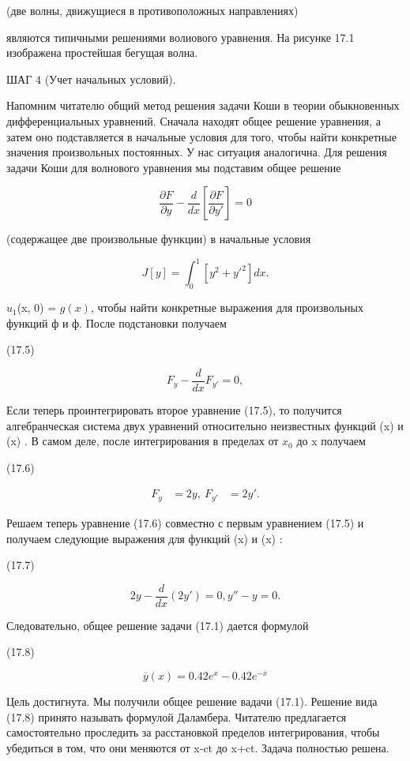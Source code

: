 \documentclass[
  ukrainian,
]{article}
\begin{document}
(две волны, движущиеся в противоположных направлениях)

являются типичными решениями волиового уравнения. На рисунке 17.1
изображена простейшая бегущая волна.

ШАГ 4 (Учет начальных условий).

Напомним читателю общий метод решения задачи Коши в теории обыкновенных
дифференциальных уравнений. Сначала находят общее решение уравнения, а
затем оно подставляется в начальные условия для того, чтобы найти
конкретные значения произвольных постоянных. У нас ситуация аналогична.
Для решения задачи Коши для волнового уравнения мы подставим общее
решение

\[
\frac{\partial F}{\partial y} - \frac{d}{dx} \left[ \frac{\partial F}{\partial y'} \right] = 0
\]

(содержащее две произвольные функции) в начальные условия

\[
J[y] = \int_{0}^{1} [y^{2} + y'^{2}] dx.
\]

\(u_1\)(x, 0) = \(g(x)\), чтобы найти конкретные выражения для
произвольных функций ф и ф. После подстановки получаем

(17.5)

\[
F_y - \frac{d}{dx} F_{y'} = 0,
\]

Если теперь проинтегрировать второе уравнение (17.5), то получится
алгебранческая система двух уравнений относительно неизвестных функций
\varphi(x) и \psi(x) . В самом деле, после интегрирования в пределах от
\(x_0\) до x получаем

(17.6)

\[
\begin{aligned} F_y &= 2y, \ F_{y'} &= 2y'. \end{aligned}
\]

Решаем теперь уравнение (17.6) совместно с первым уравнением (17.5) и
получаем следующие выражения для функций \varphi(x) и \psi(x) :

(17.7)

\[
2y - \frac{d}{dx}(2y') = 0,
y'' - y = 0.
\]

Следовательно, общее решение задачи (17.1) дается формулой

(17.8)

\[
\overline{y}(x) = 0.42e^x - 0.42e^{-x}
\]

Цель достигнута. Мы получили общее решение вадачи (17.1). Решение вида
(17.8) принято называть формулой Даламбера. Читателю предлагается
самостоятельно проследить за расстановкой пределов интегрирования, чтобы
убедиться в том, что они меняются от x-ct до x+ct. Задача полностью
решена.
\end{document}
